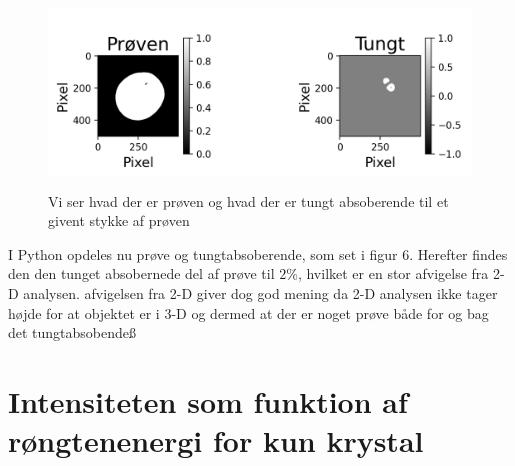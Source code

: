 \documentclass[a4paper,twoside]{article}
\begin{document}
\begin{figure}[H]
\begin{centering}
\includegraphics[height=5cm]{Tungt_og _objekt_hold_3_ny.png}
\hspace{1cm}
\par\end{centering}
\caption{\label{cap:2ien} Vi ser hvad der er prøven og hvad der er tungt absoberende til et givent stykke af prøven}
\end{figure}
I Python opdeles nu prøve og tungtabsoberende, som set i figur 6. Herefter findes den den tunget absobernede del af prøve til $2\%$, hvilket er en stor afvigelse fra 2-D analysen. afvigelsen fra 2-D giver dog god mening da 2-D analysen ikke tager højde for at objektet er i 3-D og dermed at der er noget prøve både for og bag det tungtabsobendeß

\section{Intensiteten som funktion af røngtenenergi for kun krystal}
\end{document}

